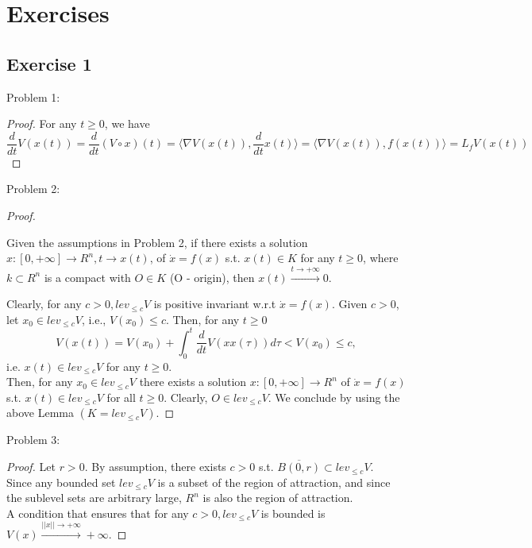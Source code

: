 \section{Exercises}

\subsection{Exercise 1}

Problem 1:
\begin{proof}
    For any $t \ge 0$, we have
    $$\frac{d}{dt}V(x(t)) = \frac{d}{dt}(V \circ x)(t) = \langle \nabla V(x(t)), \frac{d}{dt}x(t) \rangle = \langle \nabla V(x(t)),f(x(t)) \rangle = L_fV(x(t))$$
\end{proof}

Problem 2:
\begin{proof}
    \begin{Lemma}
        Given the assumptions in Problem 2, if there exists a solution $x: [ 0,+\infty ] \to R^n, t \to x(t)$, of $\dot x = f(x)$ s.t. $x(t) \in K$ for any $t \ge 0$, where $k \subset R^n$ is a compact with $O \in K$ (O - origin), then $x(t) \xrightarrow{t \to + \infty} 0.$
    \end{Lemma}
    
    Clearly, for any $c > 0, lev_{\le c}V$ is positive invariant w.r.t $\dot x = f(x)$. Given $c > 0$, let $x_0 \in lev_{\le c}V$, i.e., $V(x_0) \le c$. Then, for any $t \ge 0$
    $$V(x(t)) = V(x_0) + \int_0^t \frac{d}{dt}V(xx(\tau))d\tau < V(x_0) \le c,$$
    i.e. $x(t) \in lev_{\le c}V$ for any $t \ge 0$. \\
    Then, for any $x_0 \in lev_{\le c}V$ there exists a solution $x: [ 0,+\infty ] \to R^n$ of $\dot x = f(x)$ s.t. $x(t) \in lev_{\le c}V$ for all $t \ge 0$.
    Clearly, $O \in lev_{\le c}V$. We conclude by using the above Lemma $(K = lev_{\le c}V)$.
\end{proof}

Problem 3:
\begin{proof}
    Let $r > 0$. By assumption, there exists $c > 0$ s.t. $\overline{B(0,r)} \subset lev_{\le c}V$. \\
    Since any bounded set $lev_{\le c}V$ is a subset of the region of attraction, and since the sublevel sets are arbitrary large, $R^n$ is also the region of attraction. \\
    A condition that ensures that for any $c > 0, lev_{\le c}V$ is bounded is $V(x) \xrightarrow{||x|| \to + \infty} + \infty$.
\end{proof}

